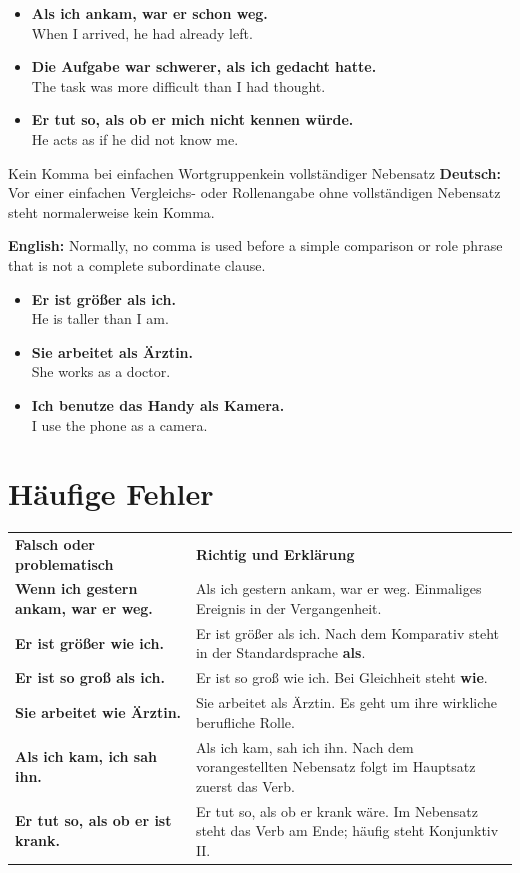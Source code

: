 \documentclass[a4paper,11pt]{article}
\newcommand{\GermanText}[1]{\textbf{Deutsch: }#1\par}
\newcommand{\EnglishText}[1]{{\small\color{SoftGray}\textbf{English: }#1\par}}
\newcommand{\ExampleItem}[2]{\item \textbf{#1}\\{\small\color{SoftGray}#2}}
\begin{document}
        \begin{exbox}
            \begin{itemize}
                \ExampleItem{Als ich ankam, war er schon weg.}{When I arrived, he had already left.}
                \ExampleItem{Die Aufgabe war schwerer, als ich gedacht hatte.}{The task was more difficult than I had thought.}
                \ExampleItem{Er tut so, als ob er mich nicht kennen würde.}{He acts as if he did not know me.}
            \end{itemize}
        \end{exbox}

        \begin{grammarentry}{Kein Komma bei einfachen Wortgruppen}{kein vollständiger Nebensatz}
            \GermanText{Vor einer einfachen Vergleichs- oder Rollenangabe ohne vollständigen Nebensatz steht normalerweise kein Komma.}
            \EnglishText{Normally, no comma is used before a simple comparison or role phrase that is not a complete subordinate clause.}
        \end{grammarentry}

        \begin{exbox}
            \begin{itemize}
                \ExampleItem{Er ist größer als ich.}{He is taller than I am.}
                \ExampleItem{Sie arbeitet als Ärztin.}{She works as a doctor.}
                \ExampleItem{Ich benutze das Handy als Kamera.}{I use the phone as a camera.}
            \end{itemize}
        \end{exbox}

    \section{Häufige Fehler}

        \begin{longtable}{>{\bfseries}p{6.1cm}|p{8.9cm}}
            \rowcolor{HeaderBlueDark}
            \color{white}\textbf{Falsch oder problematisch} &
            \color{white}\textbf{Richtig und Erklärung} \\
            Wenn ich gestern ankam, war er weg. & Als ich gestern ankam, war er weg. Einmaliges Ereignis in der Vergangenheit. \\
            Er ist größer wie ich. & Er ist größer als ich. Nach dem Komparativ steht in der Standardsprache \textbf{als}. \\
            Er ist so groß als ich. & Er ist so groß wie ich. Bei Gleichheit steht \textbf{wie}. \\
            Sie arbeitet wie Ärztin. & Sie arbeitet als Ärztin. Es geht um ihre wirkliche berufliche Rolle. \\
            Als ich kam, ich sah ihn. & Als ich kam, sah ich ihn. Nach dem vorangestellten Nebensatz folgt im Hauptsatz zuerst das Verb. \\
            Er tut so, als ob er ist krank. & Er tut so, als ob er krank wäre. Im Nebensatz steht das Verb am Ende; häufig steht Konjunktiv II. \\
        \end{longtable}
\end{document}
